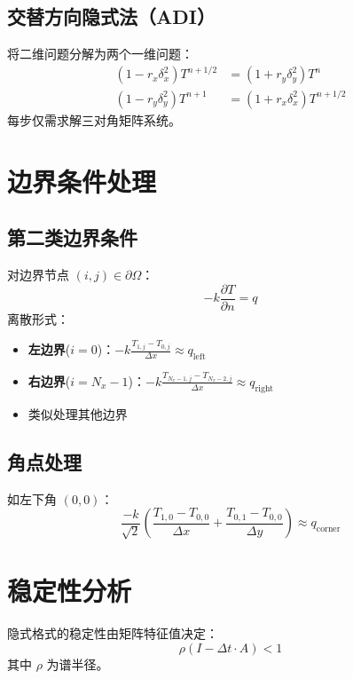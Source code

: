 \documentclass{ctexart}
\begin{document}
\subsection{交替方向隐式法（ADI）}
将二维问题分解为两个一维问题：
\begin{align}
\left(1 - r_x \delta_x^2\right) T^{n+1/2} &= \left(1 + r_y \delta_y^2\right) T^n \\
\left(1 - r_y \delta_y^2\right) T^{n+1} &= \left(1 + r_x \delta_x^2\right) T^{n+1/2}
\end{align}
每步仅需求解三对角矩阵系统。

\section{边界条件处理}

\subsection{第二类边界条件}
对边界节点 $(i,j) \in \partial \Omega$：
\begin{equation}
-k \frac{\partial T}{\partial n} = q
\end{equation}
离散形式：
\begin{itemize}
\item \textbf{左边界}($i=0$)：$-k \frac{T_{1,j} - T_{0,j}}{\Delta x} \approx q_{\text{left}}$
\item \textbf{右边界}($i=N_x-1$)：$-k \frac{T_{N_x-1,j} - T_{N_x-2,j}}{\Delta x} \approx q_{\text{right}}$
\item 类似处理其他边界
\end{itemize}

\subsection{角点处理}
如左下角 $(0,0)$：
\begin{equation}
\frac{-k}{\sqrt{2}} \left( \frac{T_{1,0} - T_{0,0}}{\Delta x} + \frac{T_{0,1} - T_{0,0}}{\Delta y} \right) \approx q_{\text{corner}}
\end{equation}

\section{稳定性分析}

隐式格式的稳定性由矩阵特征值决定：
\begin{equation}
\rho(I - \Delta t \cdot A) < 1
\end{equation}
其中 $\rho$ 为谱半径。
\end{document}
